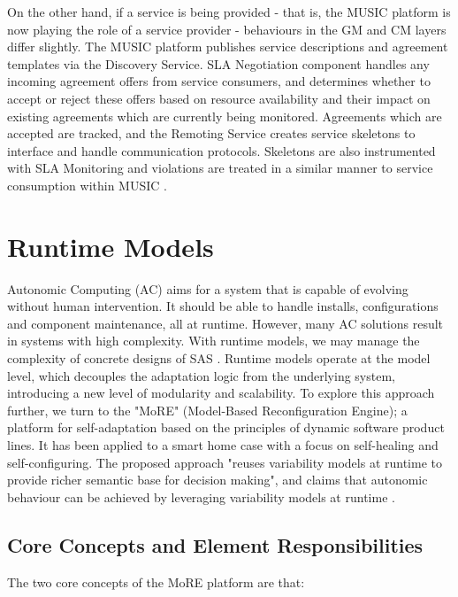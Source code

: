 \documentclass[conference]{IEEEtran}
\begin{document}
On the other hand, if a service is being provided - that is, the MUSIC platform is now playing the role of a service provider - behaviours in the GM and CM layers differ slightly. The MUSIC platform publishes service descriptions and agreement templates via the Discovery Service. SLA Negotiation component handles any incoming agreement offers from service consumers, and determines whether to accept or reject these offers based on resource availability and their impact on existing agreements which are currently being monitored. Agreements which are accepted are tracked, and the Remoting Service creates service skeletons to interface and handle communication protocols. Skeletons are also instrumented with SLA Monitoring and violations are treated in a similar manner to service consumption within MUSIC \cite{MUSIC_pdf}.

\section{\textbf{Runtime Models}}
Autonomic Computing (AC) aims for a system that is capable of evolving without human intervention. It should be able to handle installs, configurations and component maintenance, all at runtime. However, many AC solutions result in systems with high complexity. With runtime models, we may manage the complexity of concrete designs of SAS \cite{lecture6_pdf}. Runtime models operate at the model level, which decouples the adaptation logic from the underlying system, introducing a new level of modularity and scalability. To explore this approach further, we turn to the "MoRE" (Model-Based Reconfiguration Engine); a platform for self-adaptation based on the principles of dynamic software product lines. It has been applied to a smart home case with a focus on self-healing and self-configuring. The proposed approach "reuses variability models at runtime to provide richer semantic base for decision making", and claims that autonomic behaviour can be achieved by leveraging variability models at runtime \cite{quiz_pdf, MORE_pdf}.

\subsection{\textbf{Core Concepts and Element Responsibilities}}
The two core concepts of the MoRE platform are that:\\
\end{document}
